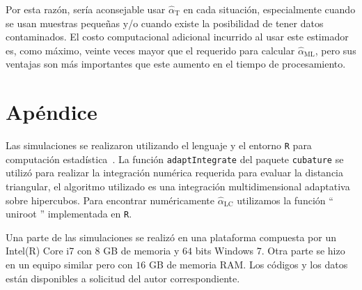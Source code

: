 Por esta razón, sería aconsejable usar $\widehat{\alpha}_{\text{T}} $ en cada situación, especialmente cuando se usan muestras pequeñas y/o cuando existe la posibilidad de tener datos contaminados.
El costo computacional adicional incurrido al usar este estimador es, como máximo, veinte veces mayor que el requerido para calcular $\widehat{\alpha}_{\text{ML}}$, pero sus ventajas son más importantes que este aumento en el tiempo de procesamiento.

\section{Apéndice}


Las simulaciones se realizaron utilizando el lenguaje y el entorno \texttt R para computación estadística~\cite{RLanguage}.
La función \texttt{adaptIntegrate} del paquete \texttt{cubature} se utilizó para realizar la integración numérica requerida para evaluar la distancia triangular, el algoritmo utilizado es una integración multidimensional adaptativa sobre hipercubos. Para encontrar numéricamente $\widehat\alpha_{\text{LC}}$ utilizamos la función `` uniroot '' implementada en \texttt R.

Una parte de las simulaciones se realizó en una plataforma compuesta por un Intel(R) Core i7 con $8$ GB de memoria y $64$ bits  Windows  7. Otra parte se hizo en un equipo similar pero con $16$ GB de memoria RAM.
Los códigos y los datos están disponibles a solicitud del autor correspondiente.